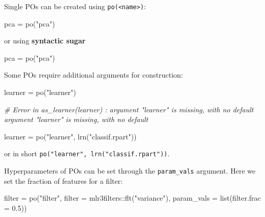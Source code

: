 \documentclass[
]{scrbook}
\newenvironment{Shaded}{\begin{snugshade}}{\end{snugshade}}
\newcommand{\AttributeTok}[1]{\textcolor[rgb]{0.77,0.63,0.00}{#1}}
\newcommand{\CommentTok}[1]{\textcolor[rgb]{0.56,0.35,0.01}{\textit{#1}}}
\newcommand{\FloatTok}[1]{\textcolor[rgb]{0.00,0.00,0.81}{#1}}
\newcommand{\FunctionTok}[1]{\textcolor[rgb]{0.00,0.00,0.00}{#1}}
\newcommand{\NormalTok}[1]{#1}
\newcommand{\OtherTok}[1]{\textcolor[rgb]{0.56,0.35,0.01}{#1}}
\newcommand{\SpecialCharTok}[1]{\textcolor[rgb]{0.00,0.00,0.00}{#1}}
\newcommand{\StringTok}[1]{\textcolor[rgb]{0.31,0.60,0.02}{#1}}
\renewenvironment{Shaded} {\begin{snugshade}\small} {\end{snugshade}}
\begin{document}
Single POs can be created using \texttt{po(\textless{}name\textgreater{})}:

\begin{Shaded}
\begin{Highlighting}[]
\NormalTok{pca }\OtherTok{=} \FunctionTok{po}\NormalTok{(}\StringTok{"pca"}\NormalTok{)}
\end{Highlighting}
\end{Shaded}

or using \textbf{syntactic sugar}

\begin{Shaded}
\begin{Highlighting}[]
\NormalTok{pca }\OtherTok{=} \FunctionTok{po}\NormalTok{(}\StringTok{"pca"}\NormalTok{)}
\end{Highlighting}
\end{Shaded}

Some POs require additional arguments for construction:

\begin{Shaded}
\begin{Highlighting}[]
\NormalTok{learner }\OtherTok{=} \FunctionTok{po}\NormalTok{(}\StringTok{"learner"}\NormalTok{)}

\CommentTok{\# Error in as\_learner(learner) : argument "learner" is missing, with no default argument "learner" is missing, with no default}
\end{Highlighting}
\end{Shaded}

\begin{Shaded}
\begin{Highlighting}[]
\NormalTok{learner }\OtherTok{=} \FunctionTok{po}\NormalTok{(}\StringTok{"learner"}\NormalTok{, }\FunctionTok{lrn}\NormalTok{(}\StringTok{"classif.rpart"}\NormalTok{))}
\end{Highlighting}
\end{Shaded}

or in short \texttt{po("learner",\ lrn("classif.rpart"))}.

Hyperparameters of POs can be set through the \texttt{param\_vals} argument.
Here we set the fraction of features for a filter:

\begin{Shaded}
\begin{Highlighting}[]
\NormalTok{filter }\OtherTok{=} \FunctionTok{po}\NormalTok{(}\StringTok{"filter"}\NormalTok{,}
  \AttributeTok{filter =}\NormalTok{ mlr3filters}\SpecialCharTok{::}\FunctionTok{flt}\NormalTok{(}\StringTok{"variance"}\NormalTok{),}
  \AttributeTok{param\_vals =} \FunctionTok{list}\NormalTok{(}\AttributeTok{filter.frac =} \FloatTok{0.5}\NormalTok{))}
\end{Highlighting}
\end{Shaded}
\end{document}
